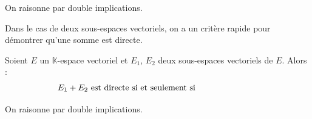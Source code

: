 \documentclass[a4paper,10pt]{report}
\newcommand{\Sum}[2]{\ensuremath{\textstyle{\sum\limits_{#1}^{#2}}}}
\begin{document}
\begin{preuve} On raisonne par double implications.



\vspace{10cm}

\newpage

\phantom{bla}

\vspace{8.5cm}
%
%
\end{preuve}
 
 \noindent Dans le cas de deux sous-espaces vectoriels, on a un critère rapide pour démontrer qu'une somme est directe.
 
 \begin{prop}\label{SommeDir2}
 Soient $E$ un $\mathbb{K}$-espace vectoriel et $E_1$, $E_2$ deux sous-espaces vectoriels de $E$. Alors :
 $$ E_1 + E_2 \hbox{ est directe si et seulement si }\phantom{ E_1 \cap E_2 = \lbrace 0_E \rbrace} $$
 \end{prop}
 
 \begin{preuve} On raisonne par double implications.
% 
% 
%

\vspace{8cm}
\end{preuve}
\end{document}

